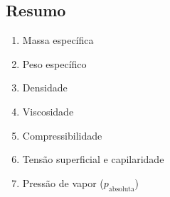 \documentclass[
	a4paper, 
	12pt, 
	brazilian
]{article}
\begin{document}
	\subsection{Resumo}
	\begin{enumerate}
		\item Massa específica
		\item Peso específico
		\item Densidade
		\item Viscosidade
		\item Compressibilidade
		\item Tensão superficial e capilaridade
		\item Pressão de vapor ($p_{\textrm{absoluta}}$)
	\end{enumerate}
\end{document}
